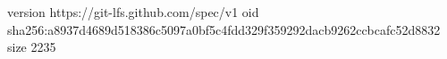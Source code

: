 version https://git-lfs.github.com/spec/v1
oid sha256:a8937d4689d518386c5097a0bf5c4fdd329f359292dacb9262ccbcafc52d8832
size 2235
